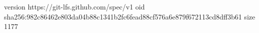 version https://git-lfs.github.com/spec/v1
oid sha256:982c86462e803da04b88c1341b2fc6fead88cf576a6e879f672113cd8dff3b61
size 1177
